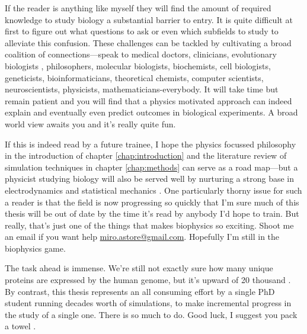 If the reader is anything like myself they will find the amount of required knowledge to study biology a substantial barrier to entry. It is quite difficult at first to figure out what questions to ask or even which subfields to study to alleviate this confusion. These challenges can be tackled by cultivating a broad coalition of connections---speak to medical doctors, clinicians, evolutionary biologists \cite{dawkins1989, dawkins2016}, philosophers, molecular biologists, biochemists, cell biologists\cite{pollard2016}, geneticists, bioinformaticians, theoretical chemists, computer scientists, neuroscientists, physicists, mathematicians-everybody. It will take time but remain patient and you will find that a physics motivated approach can indeed explain and eventually even predict outcomes in biological experiments. A broad world view awaits you and it's really quite fun. 


If this is indeed read by a future trainee, I hope the physics focussed philosophy in the introduction of chapter \ref{chap:introduction} and the literature review of simulation techniques in chapter \ref{chap:methods} can serve as a road map---but a physicist studying biology will also be served well by nurturing a strong base in electrodynamics and statistical mechanics \cite{griffiths2017, reif2009, zuckerman2010}. One particularly thorny issue for such a reader is that the field is now progressing so quickly that I'm sure much of this thesis will be out of date by the time it's read by anybody I'd hope to train. But really, that's just one of the things that makes biophysics so exciting. Shoot me an email if you want help \href{mailto:miro.astore@gmailcom}{miro.astore@gmail.com}. Hopefully I'm still in the biophysics game.

The task ahead is immense. We're still not exactly sure how many unique proteins are expressed by the human genome, but it's upward of 20 thousand \cite{salzberg2018}. By contrast, this thesis represents an all consuming effort by a single PhD student running decades worth of simulations, to make incremental progress in the study of a single one. There is so much to do. Good luck, I suggest you pack a towel \cite{adams1979}. 
